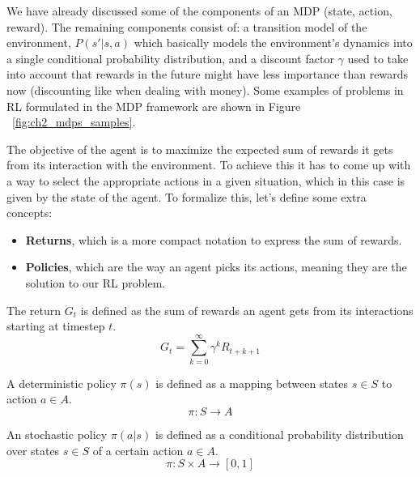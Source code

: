 We have already discussed  some of the components of an MDP (state, action, reward).
The remaining components consist of: a transition model of the environment, $P(s'|s,a)$
which basically models the environment's dynamics into a single conditional probability
distribution, and a discount factor $\gamma$ used to take into account that rewards in the future might have 
less importance than rewards now (discounting like when dealing with money). Some examples 
of problems in RL formulated in the MDP framework are shown in Figure ~\ref{fig:ch2_mdps_samples}.

\figMdpSamples

The objective of the agent is to maximize the expected sum of rewards it gets from
its interaction with the environment. To achieve this it has to come up with a
way to select the appropriate actions in a given situation, which in this case is given
by the state of the agent. To formalize this, let's  define some extra concepts:

\begin{itemize}
    \item \textbf{Returns}, which is a more compact notation to express the sum of rewards.
    \item \textbf{Policies}, which are the way an agent picks its actions, meaning they
          are the solution to our RL problem.
\end{itemize}

\newpage

\begin{definition}
    The return $G_{t}$ is defined as the sum of rewards an agent gets from its
    interactions starting at timestep $t$.
    \begin{equation}
        G_{t} = \sum_{k=0}^{\infty} \gamma^{k} R_{t+k+1}
    \end{equation}
\end{definition}

\begin{definition}
    A deterministic policy $\pi(s)$ is defined as a mapping between states $s \in S$
    to action $a \in A$.
    \begin{equation}
        \pi : S \rightarrow A
    \end{equation}
\end{definition}

\begin{definition}
    An stochastic policy $\pi(a|s)$ is defined as a conditional probability distribution over
    states $s \in S$ of a certain action $a \in A$.
    \begin{equation}
        \pi : S \times A \rightarrow [0,1]
    \end{equation}
\end{definition}

